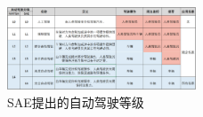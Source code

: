 \begin{figure}[h]
	\centering
	\includegraphics[width=0.5\textwidth]{image/自动驾驶等级.jpg}
	\caption{SAE提出的自动驾驶等级}
 	\label{fig:1-1}
\end{figure}
